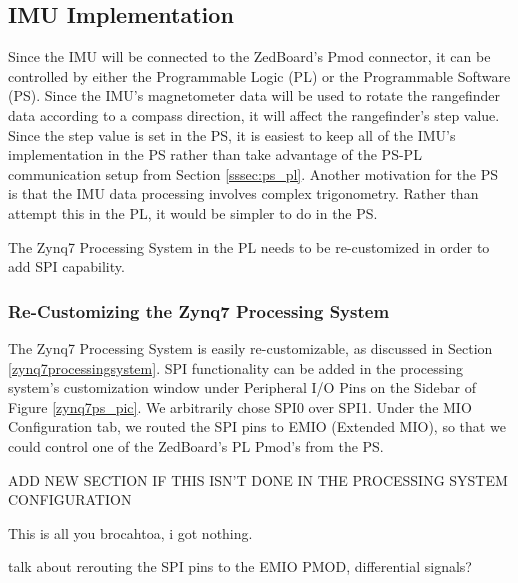 \subsection{IMU Implementation}
Since the IMU will be connected to the ZedBoard's Pmod connector, it can be controlled by either the Programmable Logic (PL) or the Programmable Software (PS). Since the IMU's magnetometer data will be used to rotate the rangefinder data according to a compass direction, it will affect the rangefinder's step value. Since the step value is set in the PS, it is easiest to keep all of the IMU's implementation in the PS rather than take advantage of the PS-PL communication setup from Section \ref{sssec:ps_pl}. Another motivation for the PS is that the IMU data processing involves complex trigonometry. Rather than attempt this in the PL, it would be simpler to do in the PS.
\par
The Zynq7 Processing System in the PL needs to be re-customized in order to add SPI capability.

\subsubsection{Re-Customizing the Zynq7 Processing System}
The Zynq7 Processing System is easily re-customizable, as discussed in Section \ref{zynq7processingsystem}. SPI functionality can be added in the processing system's customization window under Peripheral I/O Pins on the Sidebar of Figure \ref{zynq7ps_pic}. We arbitrarily chose SPI0 over SPI1. Under the MIO Configuration tab, we routed the SPI pins to EMIO (Extended MIO), so that we could control one of the ZedBoard's PL Pmod's from the PS.
\par
ADD NEW SECTION IF THIS ISN'T DONE IN THE PROCESSING SYSTEM CONFIGURATION
\par
This is all you brocahtoa, i got nothing.



talk about rerouting the SPI pins to the EMIO PMOD, differential signals?


